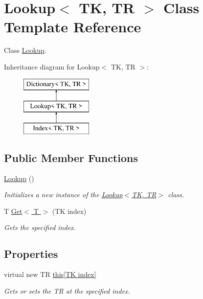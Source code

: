\hypertarget{class_lookup}{}\section{Lookup$<$ TK, TR $>$ Class Template Reference}
\label{class_lookup}


Class \hyperlink{class_lookup}{Lookup}.  


Inheritance diagram for Lookup$<$ TK, TR $>$\+:\begin{figure}[H]
\begin{center}
\leavevmode
\includegraphics[height=3.000000cm]{class_lookup}
\end{center}
\end{figure}
\subsection*{Public Member Functions}
\begin{DoxyCompactItemize}
\item 
\hyperlink{class_lookup_a9594e3583ab132612b367784ea39c0ee}{Lookup} ()
\begin{DoxyCompactList}\small\item\em Initializes a new instance of the \hyperlink{class_lookup_a9594e3583ab132612b367784ea39c0ee}{Lookup$<$\+T\+K, T\+R$>$} class. \end{DoxyCompactList}\item 
T \hyperlink{class_lookup_a6dacd9aa4eb48983ebdce15553bc16ca}{Get$<$ T $>$} (TK index)
\begin{DoxyCompactList}\small\item\em Gets the specified index. \end{DoxyCompactList}\end{DoxyCompactItemize}
\subsection*{Properties}
\begin{DoxyCompactItemize}
\item 
virtual new TR \hyperlink{class_lookup_a967e8091a6869de2da08ebf3b8cccf8a}{this\mbox{[}\+T\+K index\mbox{]}}
\begin{DoxyCompactList}\small\item\em Gets or sets the TR at the specified index. \end{DoxyCompactList}\end{DoxyCompactItemize}


